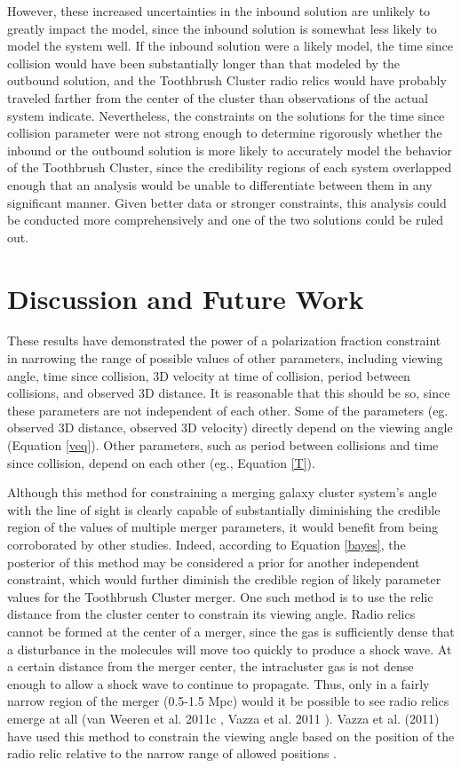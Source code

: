 \documentclass[12 pt]{article}
\begin{document}
However, these increased uncertainties in the inbound solution are unlikely to greatly impact the model, since the inbound solution is somewhat less likely to model the system well. If the inbound solution were a likely model, the time since collision would have been substantially longer than that modeled by the outbound solution, and the Toothbrush Cluster radio relics would have probably traveled farther from the center of the cluster than observations of the actual system indicate. Nevertheless, the constraints on the solutions for the time since collision parameter were not strong enough to determine rigorously whether the inbound or the outbound solution is more likely to accurately model the behavior of the Toothbrush Cluster, since the credibility regions of each system overlapped enough that an analysis would be unable to differentiate between them in any significant manner. Given better data or stronger constraints, this analysis could be conducted more comprehensively and one of the two solutions could be ruled out.

\newpage
\section{Discussion and Future Work}

These results have demonstrated the power of a polarization fraction constraint in narrowing the range of possible values of other parameters, including viewing angle, time since collision, 3D velocity at time of collision, period between collisions, and observed 3D distance. It is reasonable that this should be so, since these parameters are not independent of each other. Some of the parameters (eg. observed 3D distance, observed 3D velocity) directly depend on the viewing angle (Equation \ref{veq}). Other parameters, such as period between collisions and time since collision, depend on each other (eg., Equation \ref{T}).

Although this method for constraining a merging galaxy cluster system's angle with the line of sight is clearly capable of substantially diminishing the credible region of the values of multiple merger parameters, it would benefit from being corroborated by other studies. Indeed, according to Equation \ref{bayes}, the posterior of this method may be considered a prior for another independent constraint, which would further diminish the credible region of likely parameter values for the Toothbrush Cluster merger. One such method is to use the relic distance from the cluster center to constrain its viewing angle. Radio relics cannot be formed at the center of a merger, since the gas is sufficiently dense that a disturbance in the molecules will move too quickly to produce a shock wave. At a certain distance from the merger center, the intracluster gas is not dense enough to allow a shock wave to continue to propagate. Thus, only in a fairly narrow region of the merger (0.5-1.5 Mpc) would it be possible to see radio relics emerge at all (van Weeren et al. 2011c \cite{reinout11c}, Vazza et al. 2011 \cite{Vazza11}). Vazza et al. (2011) have used this method to constrain the viewing angle based on the position of the radio relic relative to the narrow range of allowed positions \cite{Vazza11}.
\end{document}
